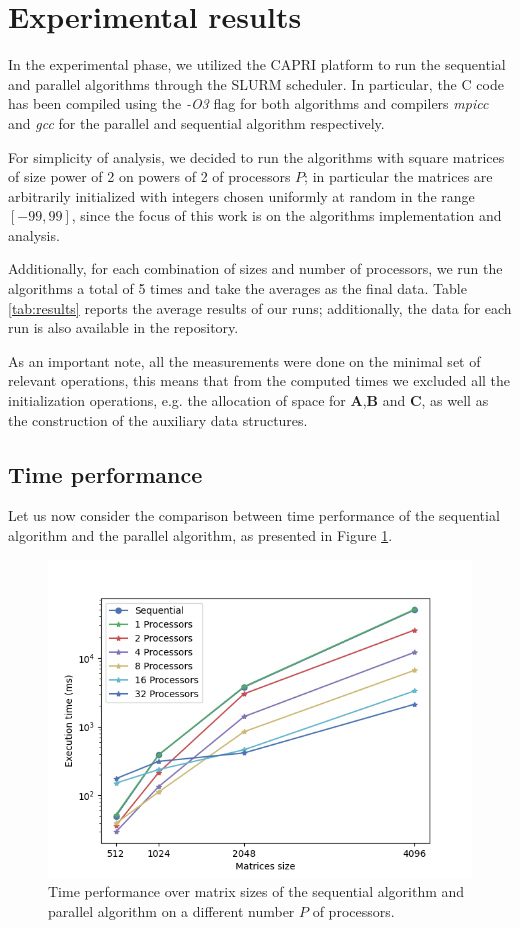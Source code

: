\section{Experimental results}



In the experimental phase, we utilized the CAPRI \cite{1} platform to run the sequential and parallel algorithms through the SLURM scheduler. In particular, the C code has been compiled using the \textit{-O3} flag for both algorithms and compilers \textit{mpicc} and \textit{gcc} for the parallel and sequential algorithm respectively.

For simplicity of analysis, we decided to run the algorithms with square matrices of size power of 2 on powers of 2 of processors $P$; in particular the matrices are arbitrarily initialized with integers chosen uniformly at random in the range $[-99, 99]$, since the focus of this work is on the algorithms implementation and analysis.

Additionally, for each combination of sizes and number of processors, we run the algorithms a total of 5 times and take the averages as the final data. Table \ref{tab:results} reports the average results of our runs; additionally, the data for each run is also available in the repository.

As an important note, all the measurements were done on the minimal set of relevant operations, this means that from the computed times we excluded all the initialization operations, e.g. the allocation of space for $\textbf{A}$,$\textbf{B}$ and $\textbf{C}$, as well as the construction of the auxiliary data structures.

\subsection{Time performance}

Let us now consider the comparison between time performance of the sequential algorithm and the parallel algorithm, as presented in Figure \ref{fig:time_size}.

\begin{figure}[hb!]
    \centering
    \includegraphics[width=0.8\linewidth]{figures/time_size.png}
    \caption{Time performance over matrix sizes of the sequential algorithm and parallel algorithm on a different number $P$ of processors.}
    \label{fig:time_size}
\end{figure}

